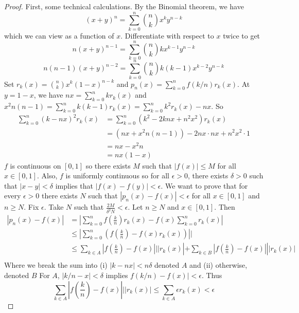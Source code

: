 \documentclass[12pt, a4paper]{book}
\theoremstyle{nonumberplain}
\newtheorem{proof}{Proof}
\begin{document}
\begin{proof}
    First, some technical calculations.
    By the Binomial theorem, we have
    \[(x+y)^n=\sum\limits_{k=0}^n\binom{n}{k}x^ky^{n-k}\]
    which we can view as a function of $x$.
    Differentiate with respect to $x$ twice to get
    \[n(x+y)^{n-1}=\sum\limits_{k=0}^n\binom{n}{k}kx^{k-1}y^{n-k}\]
    \[n(n-1)(x+y)^{n-2}=\sum\limits_{k=0}^n\binom{n}{k}k(k-1)x^{k-2}y^{n-k}\]
    Set $r_k(x)=\binom{n}{k}x^k(1-x)^{n-k}$ and $p_n(x)=\sum\limits_{k=0}^nf(k/n)r_k(x)$.
    At $y=1-x$, we have $nx=\sum\limits_{k=0}^nkr_k(x)$ and $x^2n(n-1)=\sum\limits_{k=0}^nk(k-1)r_k(x)=\sum\limits_{k=0}^nk^2r_k(x)-nx$.
    So
    \begin{align*}
        \sum\limits_{k=0}^n (k-nx)^2r_k(x) &= \sum\limits_{k=0}^n (k^2-2knx+n^2x^2)r_k(x)\\
                                           &= (nx+x^2n(n-1))-2nx\cdot nx+n^2x^2\cdot 1\\
                                           &= nx-x^2n\\
                                           &= nx(1-x)
    \end{align*}
    $f$ is continuous on $[0,1]$ so there exists $M$ such that $|f(x)|\leq M$ for all $x\in[0,1]$.
    Also, $f$ is uniformly continuous so for all $\epsilon>0$, there exists $\delta>0$ such that $|x-y|<\delta$ implies that $|f(x)-f(y)|<\epsilon$.
    We want to prove that for every $\epsilon>0$ there exists $N$ such that $|p_n(x)-f(x)|<\epsilon$ for all $x\in[0,1]$ and $n\geq N$.
    Fix $\epsilon$.
    Take $N$ such that $\frac{2M}{\delta^2N}<\epsilon$.
    Let $n\geq N$ and $x\in[0,1]$.
    Then
    \begin{align*}
        |p_n(x)-f(x)|&=\left\lvert\sum\limits_{k=0}^n f\left(\frac{k}{n}\right)r_k(x)-f(x)\sum\limits_{k=0}^nr_k(x)\right\rvert\\
                     &\leq\left\lvert\sum\limits_{k=0}^n \left(f\left(\frac{k}{n}\right)-f(x)r_k(x)\right)\right\rvert|\\
                     &\leq \sum_{k\in A}\left\lvert f\left(\frac{k}{n}\right)-f(x)\right\rvert||r_k(x)|+\sum_{k\in B}\left\lvert f\left(\frac{k}{n}\right)-f(x)\right\rvert||r_k(x)|\\
    \end{align*}
    Where we break the sum into (i) $|k-nx|<n\delta$ denoted $A$ and (ii) otherwise, denoted $B$
    For $A$, $|k/n-x|<\delta$ implies $f(k/n)-f(x)|<\epsilon$.
    Thus
    \[\sum\limits_{k\in A}\left\lvert f\left(\frac{k}{n}\right)-f(x)\right\rvert||r_k(x)|\leq\sum\limits_{k\in A}\epsilon r_k(x)<\epsilon\]


\end{proof}
\end{document}

